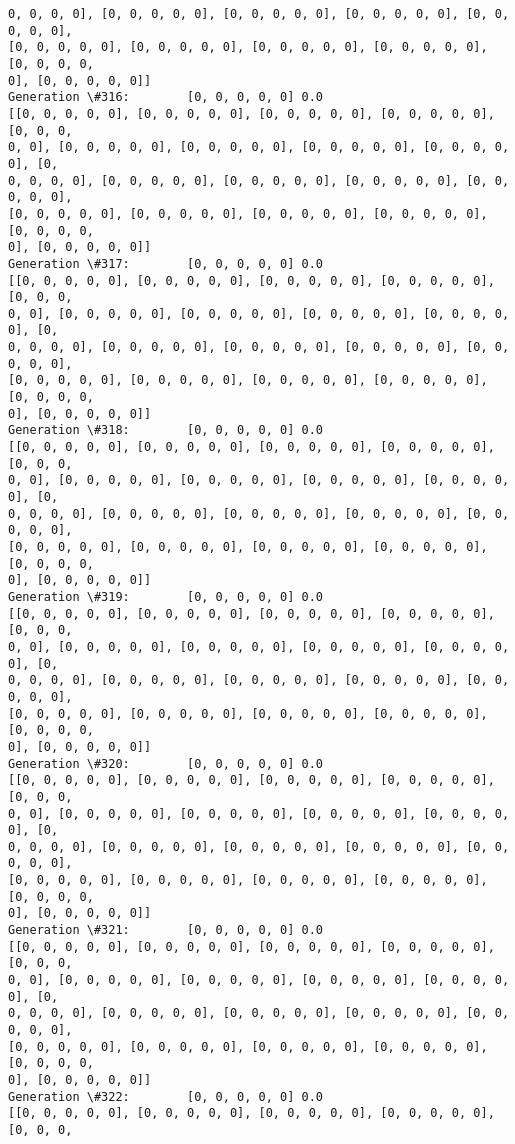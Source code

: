 \documentclass[11pt]{article}
\begin{document}
\begin{Verbatim}[commandchars=\\\{\}]
0, 0, 0, 0], [0, 0, 0, 0, 0], [0, 0, 0, 0, 0], [0, 0, 0, 0, 0], [0, 0, 0, 0, 0],
[0, 0, 0, 0, 0], [0, 0, 0, 0, 0], [0, 0, 0, 0, 0], [0, 0, 0, 0, 0], [0, 0, 0, 0,
0], [0, 0, 0, 0, 0]]
Generation \#316:        [0, 0, 0, 0, 0] 0.0
[[0, 0, 0, 0, 0], [0, 0, 0, 0, 0], [0, 0, 0, 0, 0], [0, 0, 0, 0, 0], [0, 0, 0,
0, 0], [0, 0, 0, 0, 0], [0, 0, 0, 0, 0], [0, 0, 0, 0, 0], [0, 0, 0, 0, 0], [0,
0, 0, 0, 0], [0, 0, 0, 0, 0], [0, 0, 0, 0, 0], [0, 0, 0, 0, 0], [0, 0, 0, 0, 0],
[0, 0, 0, 0, 0], [0, 0, 0, 0, 0], [0, 0, 0, 0, 0], [0, 0, 0, 0, 0], [0, 0, 0, 0,
0], [0, 0, 0, 0, 0]]
Generation \#317:        [0, 0, 0, 0, 0] 0.0
[[0, 0, 0, 0, 0], [0, 0, 0, 0, 0], [0, 0, 0, 0, 0], [0, 0, 0, 0, 0], [0, 0, 0,
0, 0], [0, 0, 0, 0, 0], [0, 0, 0, 0, 0], [0, 0, 0, 0, 0], [0, 0, 0, 0, 0], [0,
0, 0, 0, 0], [0, 0, 0, 0, 0], [0, 0, 0, 0, 0], [0, 0, 0, 0, 0], [0, 0, 0, 0, 0],
[0, 0, 0, 0, 0], [0, 0, 0, 0, 0], [0, 0, 0, 0, 0], [0, 0, 0, 0, 0], [0, 0, 0, 0,
0], [0, 0, 0, 0, 0]]
Generation \#318:        [0, 0, 0, 0, 0] 0.0
[[0, 0, 0, 0, 0], [0, 0, 0, 0, 0], [0, 0, 0, 0, 0], [0, 0, 0, 0, 0], [0, 0, 0,
0, 0], [0, 0, 0, 0, 0], [0, 0, 0, 0, 0], [0, 0, 0, 0, 0], [0, 0, 0, 0, 0], [0,
0, 0, 0, 0], [0, 0, 0, 0, 0], [0, 0, 0, 0, 0], [0, 0, 0, 0, 0], [0, 0, 0, 0, 0],
[0, 0, 0, 0, 0], [0, 0, 0, 0, 0], [0, 0, 0, 0, 0], [0, 0, 0, 0, 0], [0, 0, 0, 0,
0], [0, 0, 0, 0, 0]]
Generation \#319:        [0, 0, 0, 0, 0] 0.0
[[0, 0, 0, 0, 0], [0, 0, 0, 0, 0], [0, 0, 0, 0, 0], [0, 0, 0, 0, 0], [0, 0, 0,
0, 0], [0, 0, 0, 0, 0], [0, 0, 0, 0, 0], [0, 0, 0, 0, 0], [0, 0, 0, 0, 0], [0,
0, 0, 0, 0], [0, 0, 0, 0, 0], [0, 0, 0, 0, 0], [0, 0, 0, 0, 0], [0, 0, 0, 0, 0],
[0, 0, 0, 0, 0], [0, 0, 0, 0, 0], [0, 0, 0, 0, 0], [0, 0, 0, 0, 0], [0, 0, 0, 0,
0], [0, 0, 0, 0, 0]]
Generation \#320:        [0, 0, 0, 0, 0] 0.0
[[0, 0, 0, 0, 0], [0, 0, 0, 0, 0], [0, 0, 0, 0, 0], [0, 0, 0, 0, 0], [0, 0, 0,
0, 0], [0, 0, 0, 0, 0], [0, 0, 0, 0, 0], [0, 0, 0, 0, 0], [0, 0, 0, 0, 0], [0,
0, 0, 0, 0], [0, 0, 0, 0, 0], [0, 0, 0, 0, 0], [0, 0, 0, 0, 0], [0, 0, 0, 0, 0],
[0, 0, 0, 0, 0], [0, 0, 0, 0, 0], [0, 0, 0, 0, 0], [0, 0, 0, 0, 0], [0, 0, 0, 0,
0], [0, 0, 0, 0, 0]]
Generation \#321:        [0, 0, 0, 0, 0] 0.0
[[0, 0, 0, 0, 0], [0, 0, 0, 0, 0], [0, 0, 0, 0, 0], [0, 0, 0, 0, 0], [0, 0, 0,
0, 0], [0, 0, 0, 0, 0], [0, 0, 0, 0, 0], [0, 0, 0, 0, 0], [0, 0, 0, 0, 0], [0,
0, 0, 0, 0], [0, 0, 0, 0, 0], [0, 0, 0, 0, 0], [0, 0, 0, 0, 0], [0, 0, 0, 0, 0],
[0, 0, 0, 0, 0], [0, 0, 0, 0, 0], [0, 0, 0, 0, 0], [0, 0, 0, 0, 0], [0, 0, 0, 0,
0], [0, 0, 0, 0, 0]]
Generation \#322:        [0, 0, 0, 0, 0] 0.0
[[0, 0, 0, 0, 0], [0, 0, 0, 0, 0], [0, 0, 0, 0, 0], [0, 0, 0, 0, 0], [0, 0, 0,

\end{Verbatim}
\end{document}
